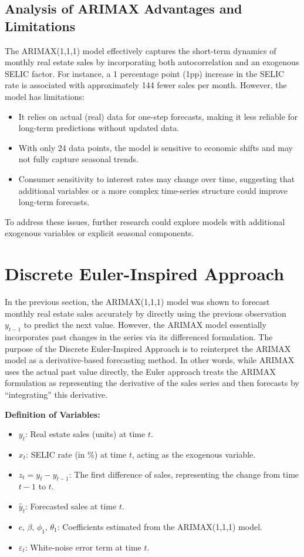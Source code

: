 \documentclass[10pt]{article}
\begin{document}
\subsection{Analysis of ARIMAX Advantages and Limitations}
The ARIMAX(1,1,1) model effectively captures the short-term dynamics of monthly real estate sales by incorporating both autocorrelation and an exogenous SELIC factor. For instance, a 1 percentage point (1pp) increase in the SELIC rate is associated with approximately 144 fewer sales per month. However, the model has limitations:
\begin{itemize}
    \item It relies on actual (real) data for one-step forecasts, making it less reliable for long-term predictions without updated data.
    \item With only 24 data points, the model is sensitive to economic shifts and may not fully capture seasonal trends.
    \item Consumer sensitivity to interest rates may change over time, suggesting that additional variables or a more complex time-series structure could improve long-term forecasts.
\end{itemize}
To address these issues, further research could explore models with additional exogenous variables or explicit seasonal components.



\section{Discrete Euler-Inspired Approach}
\label{sec:euler}

In the previous section, the ARIMAX(1,1,1) model was shown to forecast monthly real estate sales accurately by directly using the previous observation \(y_{t-1}\) to predict the next value. However, the ARIMAX model essentially incorporates past changes in the series via its differenced formulation. The purpose of the Discrete Euler-Inspired Approach is to reinterpret the ARIMAX model as a derivative-based forecasting method. In other words, while ARIMAX uses the actual past value directly, the Euler approach treats the ARIMAX formulation as representing the derivative of the sales series and then forecasts by “integrating” this derivative.

\textbf{Definition of Variables:}
\begin{itemize}
    \item \(y_t\): Real estate sales (units) at time \(t\).
    \item \(x_t\): SELIC rate (in \%) at time \(t\), acting as the exogenous variable.
    \item \(z_t = y_t - y_{t-1}\): The first difference of sales, representing the change from time \(t-1\) to \(t\).
    \item \(\hat{y}_t\): Forecasted sales at time \(t\).
    \item \(c,\,\beta,\,\phi_1,\,\theta_1\): Coefficients estimated from the ARIMAX(1,1,1) model.
    \item \(\varepsilon_t\): White-noise error term at time \(t\).
\end{itemize}
\end{document}
